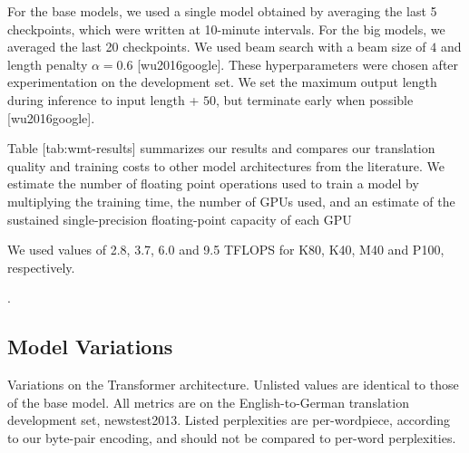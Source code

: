 \documentclass[11pt,a4paper]{article}
\begin{document}
For the base models, we used a single model obtained by averaging the last 5 checkpoints, which were written at 10-minute intervals.  For the big models, we averaged the last 20 checkpoints. We used beam search with a beam size of $4$ and length penalty $\alpha=0.6$ [wu2016google].  These hyperparameters were chosen after experimentation on the development set.  We set the maximum output length during inference to input length + $50$, but terminate early when possible [wu2016google].

Table [tab:wmt-results] summarizes our results and compares our translation quality and training costs to other model architectures from the literature.  We estimate the number of floating point operations used to train a model by multiplying the training time, the number of GPUs used, and an estimate of the sustained single-precision floating-point capacity of each GPU

We used values of 2.8, 3.7, 6.0 and 9.5 TFLOPS for K80, K40, M40 and P100, respectively.

.

\subsection{Model Variations}

Variations on the Transformer architecture. Unlisted values are identical to those of the base model. All metrics are on the English-to-German translation development set, newstest2013. Listed perplexities are per-wordpiece, according to our byte-pair encoding, and should not be compared to per-word perplexities.
\end{document}

